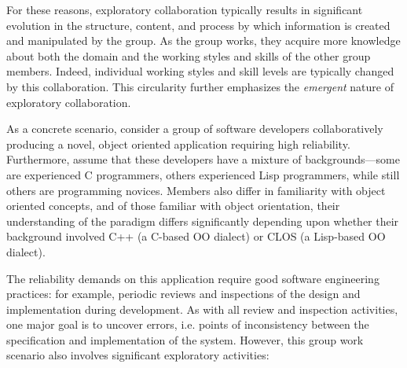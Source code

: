 For these reasons, exploratory collaboration typically results in significant evolution in the structure, content, and process by which information is created and manipulated by the group.  As the group works, they acquire more knowledge about both the domain and the working styles and skills of the other group members.  Indeed, individual working styles and skill levels are typically changed by this collaboration.  This circularity further emphasizes the {\it emergent} nature of exploratory collaboration.

As a concrete scenario, consider a group of software developers collaboratively producing a novel, object oriented application requiring high reliability.  Furthermore, assume that these developers have a mixture of backgrounds---some are experienced C programmers, others experienced Lisp programmers, while still others are programming novices. Members also differ in familiarity with object oriented concepts, and of those familiar with object orientation, their understanding of the paradigm differs significantly depending upon whether their background involved C++ (a C-based OO dialect) or CLOS (a Lisp-based OO dialect).

The reliability demands on this application require good software engineering practices: for example, periodic reviews and inspections of the design and implementation during development.  As with all review and inspection activities, one major goal is to uncover errors, i.e. points of inconsistency between the specification and implementation of the system.  However, this group work scenario also involves significant exploratory activities:

